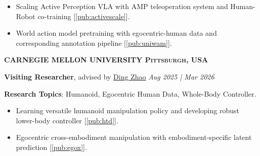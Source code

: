 \documentclass[a4paper,9pt]{extarticle}
\begin{document}
\begin{itemize}
    \item Scaling Active Perception VLA with AMP teleoperation system and Human-Robot co-training [\ref{pub:activescale}].
    \item World action model pretraining with egocentric-human data and corresponding annotation pipeline [\ref{pub:uniwam}].
\end{itemize} 
\vspace{-0.02in}
{\textbf{\fontsize{12pt}{4pt}\selectfont C}\textbf{\scshape ARNEGIE MELLON UNIVERSITY \hfill Pittsburgh, USA}}
\par \textbf{Visiting Researcher}, advised by \href{https://www.meche.engineering.cmu.edu/directory/bios/zhao-ding.html}{Ding Zhao} \hfill \textit{Aug 2025 | Mar 2026}
\par \textbf{Research Topics}: Humanoid, Egocentric Human Data, Whole-Body Controller. 
\vspace{-0.05in}
\begin{itemize}
    \item Learning versatile humanoid manipulation policy and developing robust lower-body controller [\ref{pub:htd}].
    \item Egocentric cross-embodiment manipulation with embodiment-specific latent prediction [\ref{pub:egox}].
\end{itemize}
\end{document}
